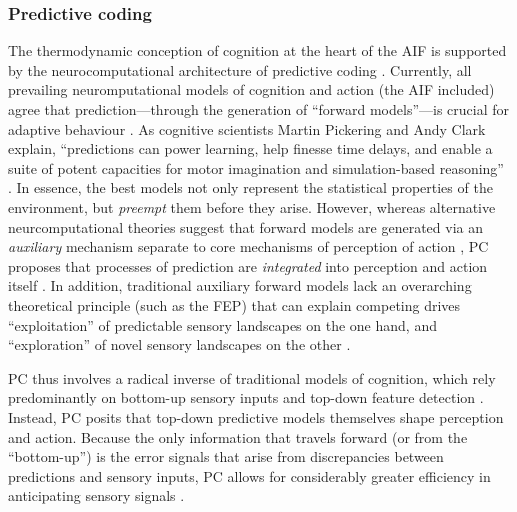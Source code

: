 \begin{CJK}{UTF8}{gbsn}
  \subsubsection{Predictive coding\label{sect:predictiveCoding}}
The thermodynamic conception of cognition at the heart of the AIF is supported by the neurocomputational architecture of predictive coding  \citep[hereafter PC, see][]{Rao1999,Clark2013}.  Currently, all prevailing neuromputational models of cognition and action (the AIF included) agree that prediction---through the generation of ``forward models''---is crucial for adaptive behaviour \citep{Wolpert2003,Clark2013}.  As cognitive scientists Martin Pickering and Andy Clark explain, ``predictions can power learning, help finesse time delays, and enable a suite of potent capacities for motor imagination and simulation-based reasoning'' \citep[6]{Pickering2014}.  In essence, the best models not only represent the statistical properties of the environment, but \textit{preempt} them before they arise.
However, whereas alternative neurcomputational theories suggest that forward models are generated via an \textit{auxiliary} mechanism separate to core mechanisms of perception of action \citep{Wolpert1997}, PC proposes that processes of prediction are \textit{integrated} into perception and action itself \citep[for a more detailed review of Auxiliary Forward Models and Integrative Forward Models, see Appendix~\ref{app2:motorControl};][]{Pickering2014}.  In addition, traditional auxiliary forward models lack an overarching theoretical principle (such as the FEP) that can explain competing drives ``exploitation'' of predictable sensory landscapes on the one hand, and ``exploration'' of novel sensory landscapes on the other \citep[also known as the dark room dilemma, explained in detail below in Section~\ref{sect:surprise}]{Clark2013}.

PC thus involves a radical inverse of traditional models of cognition, which rely predominantly on bottom-up sensory inputs and top-down feature detection \citep[e.g.,][]{Marr1985}. Instead, PC posits that top-down predictive models themselves shape perception and action.  Because the only information that travels forward (or from the ``bottom-up'') is the error signals that arise from discrepancies between predictions and sensory inputs, PC allows for considerably greater efficiency in anticipating sensory signals \citep[for a more detailed explanation of the PC paradigm, including its origins as a favourable data compression strategy, see Appendix~\ref{app2:predictiveCoding}][]{Pickering2014}.


\end{CJK}
